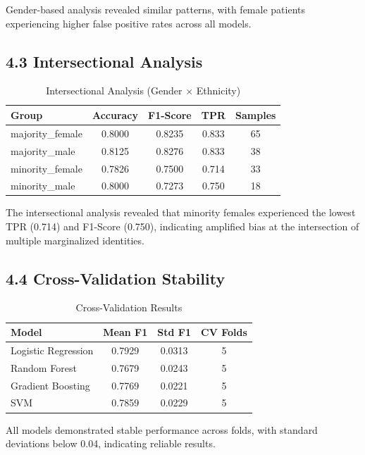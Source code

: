\documentclass[12pt,a4paper]{article}
\begin{document}
Gender-based analysis revealed similar patterns, with female patients 
experiencing higher false positive rates across all models.

\subsection{4.3 Intersectional Analysis}

\begin{table}[H]
\centering
\caption{Intersectional Analysis (Gender × Ethnicity)}
\begin{tabular}{lcccc}
\toprule
\textbf{Group} & \textbf{Accuracy} & \textbf{F1-Score} & \textbf{TPR} & \textbf{Samples} \\
\midrule
majority\_female & 0.8000 & 0.8235 & 0.833 & 65 \\
majority\_male & 0.8125 & 0.8276 & 0.833 & 38 \\
minority\_female & 0.7826 & 0.7500 & 0.714 & 33 \\
minority\_male & 0.8000 & 0.7273 & 0.750 & 18 \\
\bottomrule
\end{tabular}
\label{tab:intersectional}
\end{table}

The intersectional analysis revealed that minority females experienced 
the lowest TPR (0.714) and F1-Score (0.750), indicating amplified bias 
at the intersection of multiple marginalized identities.

\subsection{4.4 Cross-Validation Stability}

\begin{table}[H]
\centering
\caption{Cross-Validation Results}
\begin{tabular}{lccc}
\toprule
\textbf{Model} & \textbf{Mean F1} & \textbf{Std F1} & \textbf{CV Folds} \\
\midrule
Logistic Regression & 0.7929 & 0.0313 & 5 \\
Random Forest & 0.7679 & 0.0243 & 5 \\
Gradient Boosting & 0.7769 & 0.0221 & 5 \\
SVM & 0.7859 & 0.0229 & 5 \\
\bottomrule
\end{tabular}
\label{tab:cross_validation}
\end{table}

All models demonstrated stable performance across folds, with standard 
deviations below 0.04, indicating reliable results.
\end{document}
